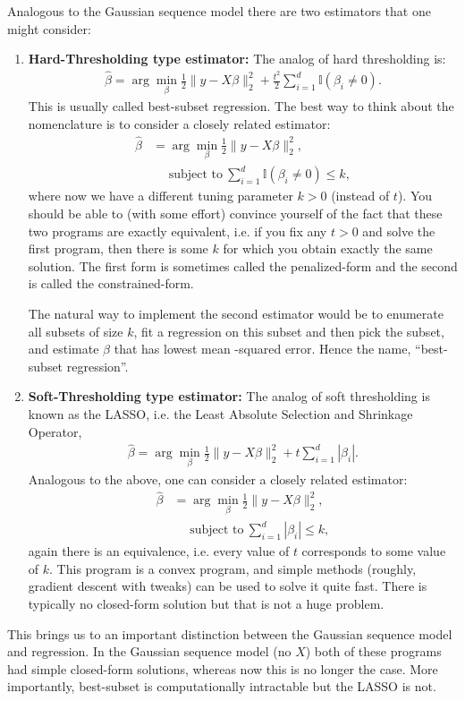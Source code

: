 \documentclass[twoside,12pt]{article}
\begin{document}
Analogous to the Gaussian sequence model there are two estimators that one might consider:
\begin{enumerate}
\item {\bf Hard-Thresholding type estimator: } The analog of hard thresholding is:
\begin{align*}
\widehat{\beta} = \arg \min_{\beta} \frac{1}{2} \| y - X\beta\|_2^2 + \frac{t^2}{2} \sum_{i=1}^d \mathbb{I}(\beta_i \neq 0).
\end{align*}
This is usually called best-subset regression. The best way to think about the nomenclature is to consider a closely related estimator:
\begin{align*}
\widehat{\beta} &= \arg \min_{\beta} \frac{1}{2} \| y - X\beta\|_2^2, \\
&~~~~~~\text{subject~to}~\sum_{i=1}^d \mathbb{I}(\beta_i \neq 0) \leq k,
\end{align*}
where now we have a different tuning parameter $k > 0$ (instead of $t$). You should be able to (with some effort) convince yourself of the fact that these two programs are exactly equivalent, i.e. if you fix any $t > 0$ and solve the first program, then there is some $k$ for which you obtain exactly the same solution. The first form is sometimes called the penalized-form and the second is called the constrained-form.



The natural way to implement the second estimator would be to enumerate all subsets of size $k$, fit a regression on this subset and then pick the subset, and estimate $\beta$ that has lowest mean -squared error. Hence the name, ``best-subset regression''.

\item {\bf Soft-Thresholding type estimator: } The analog of soft thresholding is known as the LASSO, i.e. the Least Absolute Selection and Shrinkage Operator,
\begin{align*}
\widehat{\beta} = \arg \min_{\beta} \frac{1}{2} \| y - X\beta\|_2^2 + t \sum_{i=1}^d |\beta_i|.
\end{align*}
Analogous to the above, one can consider a closely related estimator:
\begin{align*}
\widehat{\beta} &= \arg \min_{\beta} \frac{1}{2} \| y - X\beta\|_2^2, \\
&~~~~~~\text{subject~to}~\sum_{i=1}^d |\beta_i| \leq k,
\end{align*}
again there is an equivalence, i.e. every value of $t$ corresponds to some value of $k$. 
This program is a convex program, and simple methods (roughly, gradient descent with tweaks) can be used to solve it quite fast. There is typically no closed-form solution but that is not a huge problem.
\end{enumerate}
This brings us to an important distinction between the Gaussian sequence model and regression. In the Gaussian sequence model (no $X$) both of these programs had simple closed-form solutions, whereas now this is no longer the case. More importantly, best-subset is computationally intractable but the LASSO is not.
\end{document}
